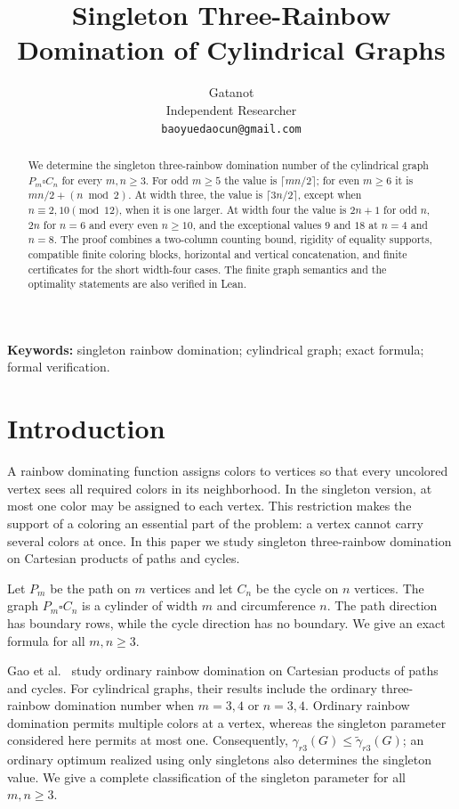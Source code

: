 \documentclass[11pt]{article}
\title{Singleton Three-Rainbow Domination of Cylindrical Graphs}
\author{Gatanot\\
Independent Researcher\\
\texttt{baoyuedaocun@gmail.com}}
\date{}
\theoremstyle{definition}
\theoremstyle{remark}
\newcommand{\srdom}{\widetilde\gamma_{r3}}
\begin{document}
\maketitle

\begin{abstract}
We determine the singleton three-rainbow domination number of the cylindrical graph $P_m\square C_n$ for every $m,n\geq 3$. For odd $m\geq 5$ the value is $\lceil mn/2\rceil$; for even $m\geq 6$ it is $mn/2+(n\bmod 2)$. At width three, the value is $\lceil 3n/2\rceil$, except when $n\equiv 2,10\pmod {12}$, when it is one larger. At width four the value is $2n+1$ for odd $n$, $2n$ for $n=6$ and every even $n\geq 10$, and the exceptional values $9$ and $18$ at $n=4$ and $n=8$. The proof combines a two-column counting bound, rigidity of equality supports, compatible finite coloring blocks, horizontal and vertical concatenation, and finite certificates for the short width-four cases. The finite graph semantics and the optimality statements are also verified in Lean.
\end{abstract}

\noindent\textbf{Keywords:} singleton rainbow domination; cylindrical graph; exact formula; formal verification.

\section{Introduction}

A rainbow dominating function assigns colors to vertices so that every uncolored vertex sees all required colors in its neighborhood. In the singleton version, at most one color may be assigned to each vertex. This restriction makes the support of a coloring an essential part of the problem: a vertex cannot carry several colors at once. In this paper we study singleton three-rainbow domination on Cartesian products of paths and cycles.

Let $P_m$ be the path on $m$ vertices and let $C_n$ be the cycle on $n$ vertices. The graph $P_m\square C_n$ is a cylinder of width $m$ and circumference $n$. The path direction has boundary rows, while the cycle direction has no boundary. We give an exact formula for all $m,n\geq 3$.

Gao et al.~\cite{Gao2024} study ordinary rainbow domination on Cartesian products of paths and cycles. For cylindrical graphs, their results include the ordinary three-rainbow domination number when $m=3,4$ or $n=3,4$. Ordinary rainbow domination permits multiple colors at a vertex, whereas the singleton parameter considered here permits at most one. Consequently, $\gamma_{r3}(G)\leq\srdom(G)$; an ordinary optimum realized using only singletons also determines the singleton value. We give a complete classification of the singleton parameter for all $m,n\geq3$.
\end{document}
